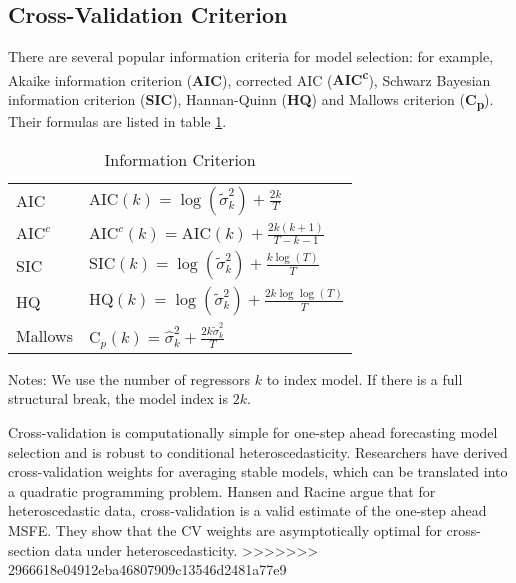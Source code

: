 \subsection{Cross-Validation Criterion}
There are several popular information criteria for model selection: for example, Akaike information criterion (\textbf{AIC}), corrected AIC (\textbf{AIC\textsuperscript{c}}), Schwarz Bayesian information criterion (\textbf{SIC}), Hannan-Quinn (\textbf{HQ}) and Mallows criterion (\textbf{C\textsubscript{p}}). Their formulas are listed in table \ref{tb:1}.
\begin{table}
\centering
\caption{Information Criterion} \label{tb:1}
\begin{threeparttable}
\begin{tabular}{ll}
\toprule
AIC                 & $\mathrm{AIC}(k) = \log{(\tilde{\sigma}^{2}_{k})} + \frac{2k}{T}$ \\[0.4em]
$\mathrm{AIC}^{c}$  & $\mathrm{AIC}^{c}(k) = \mathrm{AIC}(k) + \frac{2k(k+1)}{T-k-1}$ \\[0.4em]
SIC                 & $\mathrm{SIC}(k) = \log{(\tilde{\sigma}^{2}_{k})} + \frac{k\log{(T)}}{T}$ \\[0.4em]
HQ                  & $\mathrm{HQ}(k) = \log{(\tilde{\sigma}^{2}_{k})} + \frac{2k\log{\log(T)}}{T}$ \\[0.4em]
Mallows            & $\mathrm{C}_{p}(k) = \hat{\sigma}^{2}_{k} + \frac{2k\tilde{\sigma}^{2}_{k}}{T}$\\
\bottomrule
\end{tabular}
\begin{tablenotes} \footnotesize
Notes: We use the number of regressors $k$ to index model. If there is a full structural break, the model index is $2k$.
\end{tablenotes}
\end{threeparttable}
\end{table}

Cross-validation is computationally simple for one-step ahead forecasting model selection and is robust to conditional heteroscedasticity. Researchers have derived cross-validation weights for averaging stable models, which can be translated into a quadratic programming problem. Hansen and Racine \cite{hansen2011jackknife} argue that for heteroscedastic data, cross-validation is a valid estimate of the one-step ahead MSFE. They show that the CV weights are asymptotically optimal for cross-section data under heteroscedasticity.
>>>>>>> 2966618e04912eba46807909c13546d2481a77e9

